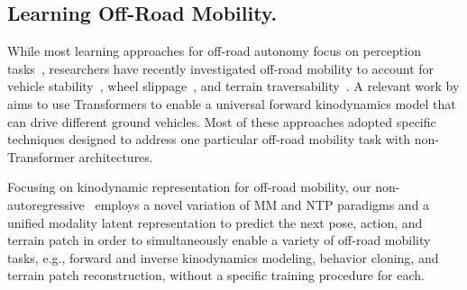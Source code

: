 \subsection{Learning Off-Road Mobility.}
While most learning approaches for off-road autonomy focus on perception tasks~\cite{xiao2022motion, wigness2019rugd, jiang2021rellis}, researchers have recently investigated off-road mobility to account for vehicle stability~\cite{bae2021curriculum, lee2023learning, datar2024learning, pokhrel2024cahsor}, wheel slippage~\cite{siva2019robot, siva2022nauts, sharma2023ramp}, and terrain traversability~\cite{fan2021step, triest2022tartandrive, castro2023does, seo2023learning, cai2024evora}. A relevant work by \citet{xiao2024anycar} aims to use Transformers to enable a universal forward kinodynamics model that can drive different ground vehicles. Most of these approaches adopted specific techniques designed to address one particular off-road mobility task with non-Transformer architectures. 

Focusing on kinodynamic representation for off-road mobility, our non-autoregressive \former~employs a novel variation of MM and NTP paradigms and a unified modality latent representation to predict the next pose, action, and terrain patch in order to simultaneously enable a variety of off-road mobility tasks, e.g., forward and inverse kinodynamics modeling, behavior cloning, and terrain patch reconstruction, without a specific training procedure for each.  